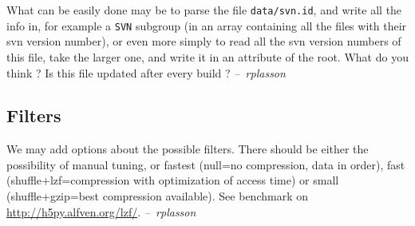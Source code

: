 \documentclass[a4paper,12pt]{article}
\begin{document}
What can be easily done may be to parse the file
\texttt{data/svn.id}, and write all the info in, for example a
\texttt{SVN} subgroup (in an array containing all the files with their
svn version number), or even more simply to read all the svn version
numbers of this file, take the larger one, and write it in an attribute
of the root. What do you think ? Is this file updated after every
build ?
\emph{\quad--~rplasson}


\subsection{Filters}
\label{sec:filters}

We may add options about the possible filters. There should be either
the possibility of manual tuning, or fastest (null=no compression,
data in order), fast (shuffle+lzf=compression with optimization of
access time) or small (shuffle+gzip=best compression available). See
benchmark on \url{http://h5py.alfven.org/lzf/}.
\emph{\quad--~rplasson}
\end{document}
